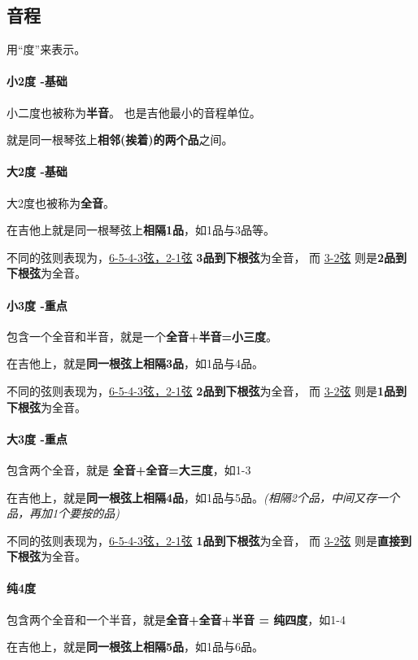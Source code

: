 \documentclass[UTF8,a4paper,12pt]{ctexbook}
\begin{document}
		\subsection*{音程}
			用“度”来表示。
			\paragraph{小2度 -基础}
				小二度也被称为\textbf{半音}。 也是吉他最小的音程单位。
				
				就是同一根琴弦上\textbf{相邻(挨着)的两个品}之间。
				
			\paragraph{大2度 -基础}
				大2度也被称为\textbf{全音}。
				
				在吉他上就是同一根琴弦上\textbf{相隔1品}，如1品与3品等。
				
				不同的弦则表现为，\underline{6-5-4-3弦，2-1弦} \textbf{3品到下根弦}为全音， 而 \underline{3-2弦} 则是\textbf{2品到下根弦}为全音。
				
			\paragraph{小3度 -重点}
				包含一个全音和半音，就是一个\textbf{全音+半音=小三度}。
				
				在吉他上，就是\textbf{同一根弦上相隔3品}，如1品与4品。

				不同的弦则表现为，\underline{6-5-4-3弦，2-1弦} \textbf{2品到下根弦}为全音， 而 \underline{3-2弦} 则是\textbf{1品到下根弦}为全音。
				
			\paragraph{大3度 -重点}		
				包含两个全音，就是 \textbf{全音+全音=大三度}，如1-3
				
				在吉他上，就是\textbf{同一根弦上相隔4品}，如1品与5品。\textit{(相隔2个品，中间又存一个品，再加1个要按的品)}
				
				不同的弦则表现为，\underline{6-5-4-3弦，2-1弦} \textbf{1品到下根弦}为全音， 而 \underline{3-2弦} 则是\textbf{直接到下根弦}为全音。
			\paragraph{纯4度}
				包含两个全音和一个半音，就是\textbf{全音+全音+半音 = 纯四度}，如1-4
				
				在吉他上，就是\textbf{同一根弦上相隔5品}，如1品与6品。
				
\end{document}
